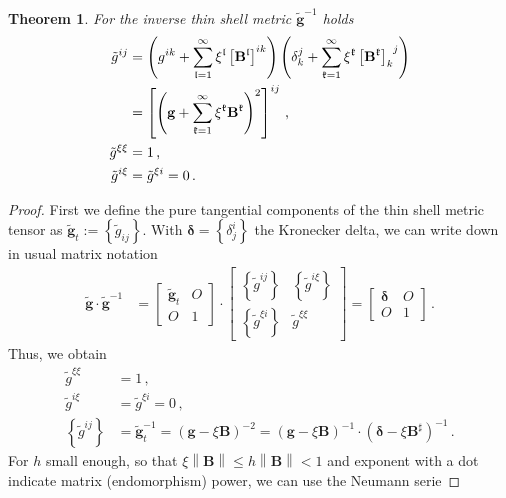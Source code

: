 \documentclass[a4paper,10pt]{scrartcl}
\newcommand{\gb}{\mathbf{g}}
\newcommand{\tgb}{\tilde{\gb}}
\newcommand{\tg}{\tilde{g}}
\newcommand{\Bb}{\mathbf{B}}
\newcommand{\deltab}{\bm{\delta}}
\newcommand{\frakk}{\mathfrak{k}}
\newcommand{\frakl}{\mathfrak{l}}
\newcommand{\formComma}{\,\text{,}}
\newcommand{\formPeriod}{\,\text{.}}
\newtheorem{theorem}{Theorem}
\begin{document}
\begin{theorem}
  For the inverse thin shell metric \( \tgb^{-1} \) holds
  \begin{align}
    \tg^{ij} &= \left( g^{ik} + \sum_{\frakl = 1}^{\infty} \xi^{\frakl}\left[ \Bb^{\frakl} \right]^{ik} \right)
               \left( \delta_{k}^{j} + \sum_{\frakk = 1}^{\infty} \xi^{\frakk}\tensor{\left[ \Bb^{\frakk} \right]}{_{k}^{j}} \right) \\
             &= \left[\left( \gb + \sum_{\frakk = 1}^{\infty} \xi^{\frakk} \Bb^{\frakk} \right)^{2}\right]^{ij}\formComma\\
    \tg^{\xi\xi} &= 1 \formComma\\
    \tg^{i\xi} &= \tg^{\xi i} = 0 \formPeriod
  \end{align}
\end{theorem}
\begin{proof}
  First we define the pure tangential components of the thin shell metric tensor as \( \tgb_{t} := \left\{ \tg_{ij} \right\} \).
  With \( \deltab = \left\{ \delta^{i}_{j} \right\} \) the Kronecker delta, we can write down in usual matrix notation
  \begin{align}
    \tgb\cdot\tgb^{-1} &=
      \begin{bmatrix}
        \tgb_{t} & O \\
          O      & 1
      \end{bmatrix}
      \cdot
      \begin{bmatrix}
         \left\{ \tg^{ij} \right\} & \left\{ \tg^{i\xi} \right\} \\
         \left\{ \tg^{\xi i} \right\} & \tg^{\xi\xi}
      \end{bmatrix}
          =
             \begin{bmatrix}
                \deltab & O \\
                O       & 1
             \end{bmatrix} \formPeriod
  \end{align}
  Thus, we obtain
  \begin{align}
    \tg^{\xi\xi} &= 1 \formComma\\
    \tg^{i\xi} &= \tg^{\xi i} = 0 \formComma\\
    \left\{ \tg^{ij} \right\} &= \tgb_{t}^{-1}
                         =\left( \gb - \xi\Bb \right)^{-2}
                         = \left( \gb - \xi\Bb \right)^{-1} \cdot \left( \deltab - \xi\Bb^{\sharp} \right)^{-1}\formPeriod
  \end{align}
  For \( h \) small enough, so that \( \xi\left\| \Bb \right\| \le h\left\| \Bb \right\| < 1 \) and exponent with a dot indicate matrix (endomorphism) power, we can use the Neumann serie 

\end{proof}
\end{document}
